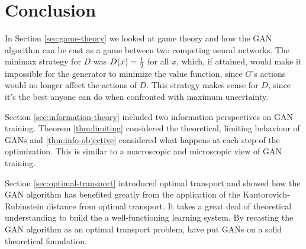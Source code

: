 \section{Conclusion}

In Section \ref{sec:game-theory} we looked at game theory and how the
GAN algorithm can be cast as a game between two competing neural
networks.  The minimax strategy for $D$ was $D(x) = {1 \over 2}$ for
all $x$, which, if attained, would make it impossible for the
generator to minimize the value function, since $G$'s actions would no
longer affect the actions of $D$.  This strategy makes sense for $D$,
since it's the best anyone can do when confronted with maximum
uncertainty.

Section \ref{sec:information-theory} included two information
perspectives on GAN training. Theorem \ref{thm:limiting} considered
the theoretical, limiting behaviour of GANs and
\ref{thm:info-objective} considered what happens at each step of the
optimization.  This is similar to a macroscopic and microscopic view
of GAN training.

Section \ref{sec:optimal-transport} introduced optimal transport and
showed how the GAN algorithm has benefited greatly from the
application of the Kantorovich-Rubinstein distance from optimal
transport.  It takes a great deal of theoretical understanding to
build the a well-functioning learning system.  By recasting the GAN
algorithm as an optimal transport problem, \cite{ref:arjovsky-2017}
have put GANs on a solid theoretical foundation.

